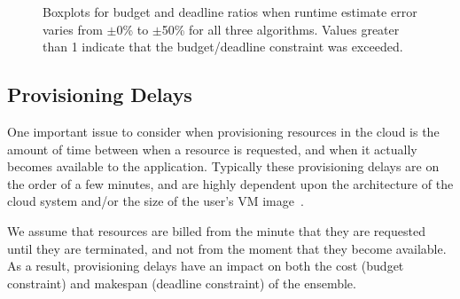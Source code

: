 \documentclass[conference]{IEEEtran}
\begin{document}
\begin{figure}[tb]
    \centering
    \hspace{2cm}
    \caption{Boxplots for budget and deadline ratios when runtime estimate 
    error varies from $\pm$0\% to $\pm$50\% for all three algorithms. Values 
    greater than 1 indicate that the budget/deadline constraint was exceeded.}
    \label{fig:variances}
\end{figure}


\subsection{Provisioning Delays}
\label{sec:delays}

One important issue to consider when provisioning resources in the cloud is
the amount of time between when a resource is requested, and when it actually
becomes available to the application. Typically these provisioning delays are
on the order of a few minutes, and are highly dependent upon the architecture
of the cloud system and/or the size of the user's VM image~\cite{Nurmi2008b}.

We assume that resources are billed from the minute that they are requested
until they are terminated, and not from the moment that they become available.
As a result, provisioning delays have an impact on both the cost (budget
constraint) and makespan (deadline constraint) of the ensemble.
\end{document}
